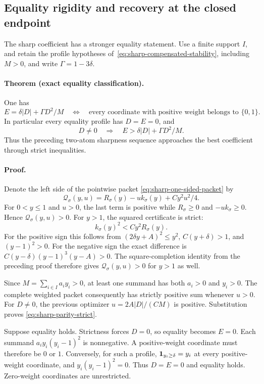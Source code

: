 \subsection{Equality rigidity and recovery at the closed endpoint}
\label{sec:sharp-parity-rigidity}

The sharp coefficient has a stronger equality statement.  Use a finite
support \(I\), and retain the profile hypotheses
of~\eqref{eq:sharp-compensated-stability}, including
\(M>0\), and write \(\Gamma=1-3\delta\).

\paragraph{Theorem (exact equality classification).}
One has
\[
 E=\delta|D|+\Gamma D^2/M
 \quad\Longleftrightarrow\quad
 \text{every coordinate with positive weight belongs to }\{0,1\}.
\]
In particular every equality profile has \(D=E=0\), and
\begin{equation}\label{eq:sharp-parity-strict}
 D\ne0\quad\Longrightarrow\quad
 E>\delta|D|+\Gamma D^2/M.
\end{equation}
Thus the preceding two-atom sharpness sequence approaches the best
coefficient through strict inequalities.

\paragraph{Proof.}
Denote the left side of the pointwise packet
\eqref{eq:sharp-one-sided-packet} by
\[
 \mathcal Q_\sigma(y,u)
   =R_\sigma(y)-u k_\sigma(y)+Cy^2u^2/4.
\]
For \(0<y\le1\) and \(u>0\), the last term is positive while
\(R_\sigma\ge0\) and \(-u k_\sigma\ge0\).  Hence
\(\mathcal Q_\sigma(y,u)>0\).
For \(y>1\), the squared certificate is strict:
\[
 k_\sigma(y)^2<Cy^2R_\sigma(y).
\]
For the positive sign this follows from
\((2\delta y+A)^2\le y^2\), \(C(y+\delta)>1\), and
\((y-1)^2>0\).
For the negative sign the exact difference is
\(C(y-\delta)(y-1)^3(y-A)>0\).
The square-completion identity from the preceding proof therefore gives
\(\mathcal Q_\sigma(y,u)>0\) for \(y>1\) as well.

Since \(M=\sum_{i\in I}a_i y_i>0\), at least one summand has both
\(a_i>0\) and \(y_i>0\).  The complete weighted packet consequently has
strictly positive sum whenever \(u>0\).
For \(D\ne0\), the previous optimizer
\(u=2A|D|/(CM)\) is positive.  Substitution proves
\eqref{eq:sharp-parity-strict}.

Suppose equality holds.  Strictness forces \(D=0\), so equality becomes
\(E=0\).  Each summand \(a_i y_i(y_i-1)^2\) is nonnegative.
A positive-weight coordinate must therefore be \(0\) or \(1\).
Conversely, for such a profile,
\({\bf1}_{y_i\ge\delta}=y_i\) at every positive-weight coordinate,
and \(y_i(y_i-1)^2=0\).  Thus \(D=E=0\) and equality holds.
Zero-weight coordinates are unrestricted.

